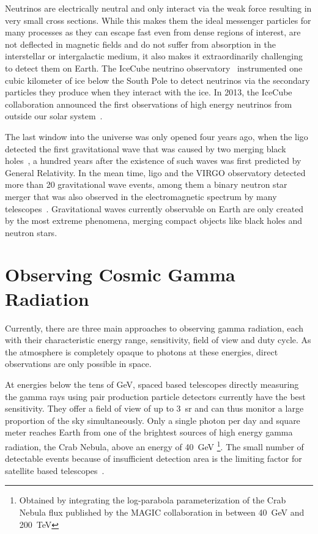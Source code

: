 Neutrinos are electrically neutral and only interact via the weak force resulting in 
very small cross sections.
While this makes them the ideal messenger particles for many processes as 
they can escape fast even from dense regions of interest, are not deflected in magnetic fields and
do not suffer from absorption in the interstellar or intergalactic medium,
it also makes it extraordinarily challenging to detect them on Earth.
The IceCube neutrino observatory~\cite{icecube} instrumented one cubic kilometer of
ice below the South Pole to detect neutrinos via the secondary particles they produce
when they interact with the ice.
In 2013, the IceCube collaboration announced the first observations of high energy neutrinos
from outside our solar system~\cite{extrasolar-neutrinos}.

The last window into the universe was only opened four years ago,
when the \gls{ligo} detected the first gravitational wave that was caused by
two merging black holes~\cite{ligo-bbm}, a hundred years after the
existence of such waves was first predicted by General Relativity.
In the mean time, \gls{ligo} and the VIRGO observatory detected more than 20 gravitational
wave events, among them a binary neutron star merger that was also observed in the electromagnetic
spectrum by many telescopes~\cite{ligo-grb}.
Gravitational waves currently observable on Earth are only created by the most extreme
phenomena, merging compact objects like black holes and neutron stars.


\section{Observing Cosmic Gamma Radiation}\label{sec:telescopes}
Currently, there are three main approaches to observing gamma radiation,
each with their characteristic energy range, sensitivity, field of view and duty cycle.
As the atmosphere is completely opaque to photons at these energies,
direct observations are only possible in space.

At energies below the tens of \si{\GeV}, spaced based telescopes directly measuring
the gamma rays using pair production particle detectors currently have the best sensitivity.
They offer a field of view of up to \SI{3}{\steradian} and can thus monitor a large proportion of the sky simultaneously.
Only a single photon per day and square meter reaches Earth from one of the brightest sources of high energy gamma radiation,
the Crab Nebula, above an energy of \SI{40}{\GeV}%
\footnote{%
  Obtained by integrating the log-parabola parameterization of the Crab Nebula flux published
  by the MAGIC collaboration in \cite{magic-crab} between \SI{40}{\GeV} and \SI{200}{\TeV}%
}.
The small number of detectable events because of insufficient detection area is the limiting factor for satellite based telescopes~\cite{gamma-astrophysics-2018}.

